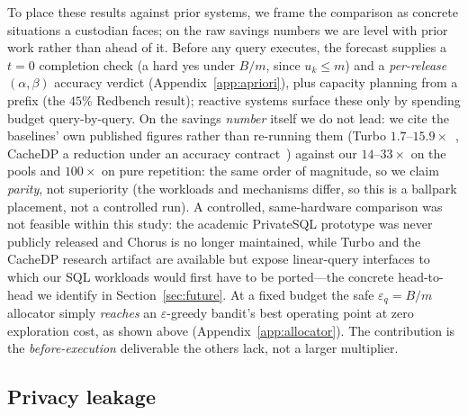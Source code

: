 \documentclass[sigconf,nonacm]{acmart}
\newcommand{\eps}{\varepsilon}
\begin{document}
To place these results against prior systems, we frame the comparison as concrete situations a custodian faces; on the raw savings numbers we are level with prior work rather than ahead of it. Before any query executes, the forecast supplies a $t{=}0$ completion check (a hard yes under $B/m$, since $u_k\le m$) and a \emph{per-release} $(\alpha,\beta)$ accuracy verdict (Appendix~\ref{app:apriori}), plus capacity planning from a prefix (the $45\%$ Redbench result); reactive systems surface these only by spending budget query-by-query. On the savings \emph{number} itself we do not lead: we cite the baselines' own published figures rather than re-running them (Turbo $1.7$--$15.9\times$~\cite{kostopoulou2023turbo}, CacheDP a reduction under an accuracy contract~\cite{mazmudar2023cachedp}) against our $14$--$33\times$ on the pools and $100\times$ on pure repetition: the same order of magnitude, so we claim \emph{parity}, not superiority (the workloads and mechanisms differ, so this is a ballpark placement, not a controlled run). A controlled, same-hardware comparison was not feasible within this study: the academic PrivateSQL prototype was never publicly released and Chorus is no longer maintained, while Turbo and the CacheDP research artifact are available but expose linear-query interfaces to which our SQL workloads would first have to be ported---the concrete head-to-head we identify in Section~\ref{sec:future}. At a fixed budget the safe $\eps_q{=}B/m$ allocator simply \emph{reaches} an $\eps$-greedy bandit's best operating point at zero exploration cost, as shown above (Appendix~\ref{app:allocator}). The contribution is the \emph{before-execution} deliverable the others lack, not a larger multiplier.

\subsection{Privacy leakage}
\end{document}
